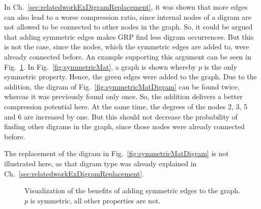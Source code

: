 In Ch.~\ref{sec:relatedworkExDigramReplacement}, it was shown that more edges can also lead to a worse compression ratio, since internal nodes of a digram are not allowed to be connected to other nodes in the graph. So, it could be argued that adding symmetric edges makes GRP find less digram occurrences. But this is not the case, since the nodes, which the symmetric edges are added to, were already connected before. An example supporting this argument can be seen in Fig.~\ref{fig:symmetricMatIndirect}. In Fig.~\ref{fig:symmetricMat}, a graph is shown whereby $p$ is the only symmetric property. Hence, the green edges were added to the graph. Due to the addition, the digram of Fig.~\ref{fig:symmetricMatDigram} can be found twice, whereas it was previously found only once. So, the addition delivers a better compression potential here. At the same time, the degrees of  the nodes 2, 3, 5 and 6 are increased by one. But this should not decrease the probability of finding other digrams in the graph, since those nodes were already connected before.

The replacement of the digram in Fig.~\ref{fig:symmetricMatDigram} is not illustrated here, as that digram type was already explained in Ch.~\ref{sec:relatedworkExDigramReplacement}.

\begin{figure}[h]
	\centering
	\hfill
	\caption{Visualization of the benefits of adding symmetric edges to the graph. $p$ is symmetric, all other properties are not.}
	\label{fig:symmetricMatIndirect}
\end{figure}

